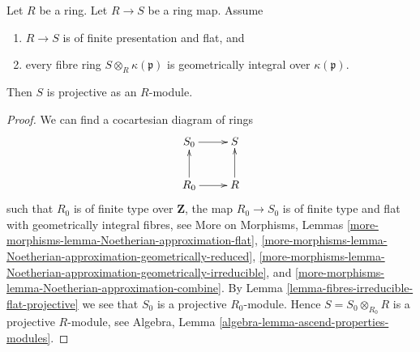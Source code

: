 \begin{lemma}
\label{lemma-fibres-irreducible-flat-projective-nonnoetherian}
Let $R$ be a ring. Let $R \to S$ be a ring map.
Assume
\begin{enumerate}
\item $R \to S$ is of finite presentation and flat, and
\item every fibre ring $S \otimes_R \kappa(\mathfrak p)$ is
geometrically integral over $\kappa(\mathfrak p)$.
\end{enumerate}
Then $S$ is projective as an $R$-module.
\end{lemma}

\begin{proof}
We can find a cocartesian diagram of rings
$$
\xymatrix{
S_0 \ar[r] & S \\
R_0 \ar[u] \ar[r] & R \ar[u]
}
$$
such that $R_0$ is of finite type over $\mathbf{Z}$, the map
$R_0 \to S_0$ is of finite type and flat with geometrically integral
fibres, see
More on Morphisms,
Lemmas \ref{more-morphisms-lemma-Noetherian-approximation-flat},
\ref{more-morphisms-lemma-Noetherian-approximation-geometrically-reduced},
\ref{more-morphisms-lemma-Noetherian-approximation-geometrically-irreducible},
and \ref{more-morphisms-lemma-Noetherian-approximation-combine}.
By
Lemma \ref{lemma-fibres-irreducible-flat-projective}
we see that $S_0$ is a projective $R_0$-module. Hence $S = S_0 \otimes_{R_0} R$
is a projective $R$-module, see
Algebra, Lemma \ref{algebra-lemma-ascend-properties-modules}.
\end{proof}


